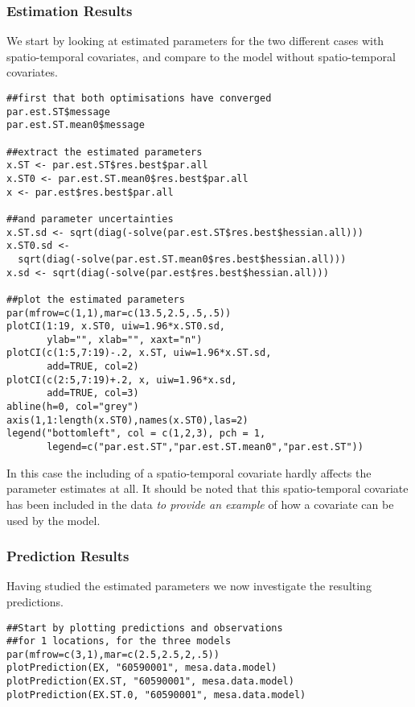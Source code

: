 \subsubsection{Estimation Results }
We start by looking at estimated parameters for the two different cases 
with spatio\hyp{}temporal covariates, and compare to the model without
spatio\hyp{}temporal covariates.
\vspace*{-0.5\baselineskip}
\begin{verbatim}
##first that both optimisations have converged
par.est.ST$message
par.est.ST.mean0$message

##extract the estimated parameters
x.ST <- par.est.ST$res.best$par.all
x.ST0 <- par.est.ST.mean0$res.best$par.all
x <- par.est$res.best$par.all

##and parameter uncertainties
x.ST.sd <- sqrt(diag(-solve(par.est.ST$res.best$hessian.all)))
x.ST0.sd <- 
  sqrt(diag(-solve(par.est.ST.mean0$res.best$hessian.all)))
x.sd <- sqrt(diag(-solve(par.est$res.best$hessian.all)))

##plot the estimated parameters
par(mfrow=c(1,1),mar=c(13.5,2.5,.5,.5))
plotCI(1:19, x.ST0, uiw=1.96*x.ST0.sd, 
       ylab="", xlab="", xaxt="n")
plotCI(c(1:5,7:19)-.2, x.ST, uiw=1.96*x.ST.sd, 
       add=TRUE, col=2)
plotCI(c(2:5,7:19)+.2, x, uiw=1.96*x.sd, 
       add=TRUE, col=3)
abline(h=0, col="grey")
axis(1,1:length(x.ST0),names(x.ST0),las=2)
legend("bottomleft", col = c(1,2,3), pch = 1, 
       legend=c("par.est.ST","par.est.ST.mean0","par.est.ST"))
\end{verbatim}
In this case the including of a spatio\hyp{}temporal covariate hardly 
affects the parameter estimates at all. It should be noted that
this spatio\hyp{}temporal covariate has been included in the data
{\em to provide an example} of how a covariate can be used by 
the model.

\subsubsection{Prediction Results}
Having studied the estimated parameters we now 
investigate the resulting predictions. 
\vspace*{-0.5\baselineskip}
\begin{verbatim}
##Start by plotting predictions and observations 
##for 1 locations, for the three models
par(mfrow=c(3,1),mar=c(2.5,2.5,2,.5))
plotPrediction(EX, "60590001", mesa.data.model)
plotPrediction(EX.ST, "60590001", mesa.data.model)
plotPrediction(EX.ST.0, "60590001", mesa.data.model)

\end{verbatim}

